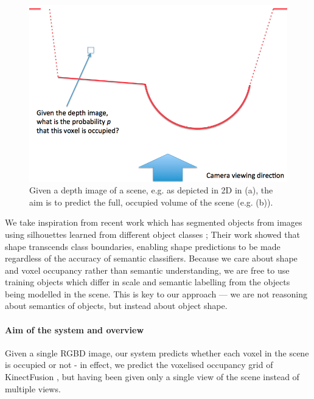 \documentclass[10pt,twocolumn,letterpaper]{article}
\makeatletter
\renewcommand*{\eg}{e.g.\@\xspace}
\makeatother
\begin{document}
\begin{figure}[!t]
  \includegraphics[width=0.98\columnwidth]{setup_ppt.png}
  \caption{Given a depth image of a scene, \eg as depicted in 2D in (a), the aim is to predict the full, occupied volume of the scene (e.g. (b)).}
  \label{fig:intro}
\end{figure}



We take inspiration from recent work which has segmented objects from images using silhouettes learned from different object classes \cite{kim-eccv-2012};
Their work showed that shape transcends class boundaries, enabling shape predictions to be made regardless of the accuracy of semantic classifiers.
Because we care about shape and voxel occupancy rather than semantic understanding, we are free to use training objects which differ in scale and semantic labelling from the objects being modelled in the scene.
This is key to our approach --- we are not reasoning about semantics of objects, but instead about object shape.

\paragraph{Aim of the system and overview}
Given a single RGBD image, our system predicts whether each voxel in the scene is occupied or not - in effect, we predict the voxelised occupancy grid of KinectFusion \cite{izadi-uist-2011}, but having been given only a single view of the scene instead of multiple views.
\end{document}
